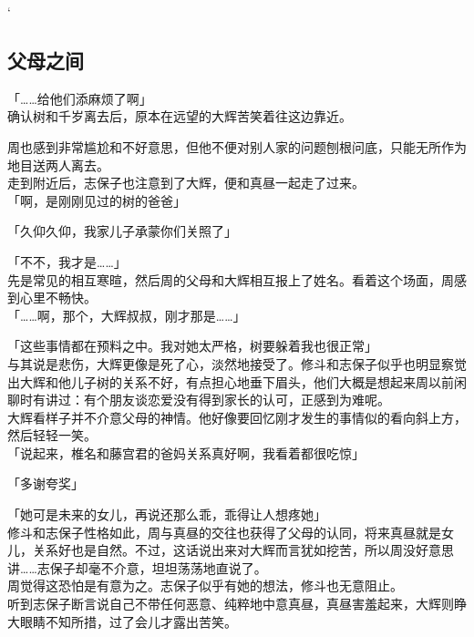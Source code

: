 `\subsection{父母之间}

「……给他们添麻烦了啊」\\

确认树和千岁离去后，原本在远望的大辉苦笑着往这边靠近。

周也感到非常尴尬和不好意思，但他不便对别人家的问题刨根问底，只能无所作为地目送两人离去。\\

走到附近后，志保子也注意到了大辉，便和真昼一起走了过来。\\

「啊，是刚刚见过的树的爸爸」

「久仰久仰，我家儿子承蒙你们关照了」

「不不，我才是……」\\

先是常见的相互寒暄，然后周的父母和大辉相互报上了姓名。看着这个场面，周感到心里不畅快。\\

「……啊，那个，大辉叔叔，刚才那是……」

「这些事情都在预料之中。我对她太严格，树要躲着我也很正常」\\

与其说是悲伤，大辉更像是死了心，淡然地接受了。修斗和志保子似乎也明显察觉出大辉和他儿子树的关系不好，有点担心地垂下眉头，他们大概是想起来周以前闲聊时有讲过：有个朋友谈恋爱没有得到家长的认可，正感到为难呢。\\

大辉看样子并不介意父母的神情。他好像要回忆刚才发生的事情似的看向斜上方，然后轻轻一笑。\\

「说起来，椎名和藤宫君的爸妈关系真好啊，我看着都很吃惊」

「多谢夸奖」

「她可是未来的女儿，再说还那么乖，乖得让人想疼她」\\

修斗和志保子性格如此，周与真昼的交往也获得了父母的认同，将来真昼就是女儿，关系好也是自然。不过，这话说出来对大辉而言犹如挖苦，所以周没好意思讲……志保子却毫不介意，坦坦荡荡地直说了。\\

周觉得这恐怕是有意为之。志保子似乎有她的想法，修斗也无意阻止。\\

听到志保子断言说自己不带任何恶意、纯粹地中意真昼，真昼害羞起来，大辉则睁大眼睛不知所措，过了会儿才露出苦笑。\\

